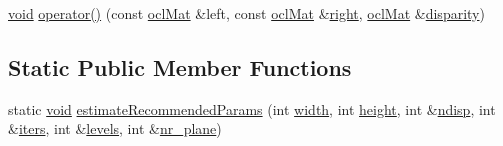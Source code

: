 \begin{DoxyCompactItemize}
\item 
\hyperlink{legacy_8hpp_a8bb47f092d473522721002c86c13b94e}{void} \hyperlink{classcv_1_1ocl_1_1StereoConstantSpaceBP_a829a71b781d10d31c9db75b9f5bcb4f7}{operator()} (const \hyperlink{classcv_1_1ocl_1_1oclMat}{ocl\-Mat} \&left, const \hyperlink{classcv_1_1ocl_1_1oclMat}{ocl\-Mat} \&\hyperlink{legacy_8hpp_a6b04b878081bf724144b73c75dfd1894}{right}, \hyperlink{classcv_1_1ocl_1_1oclMat}{ocl\-Mat} \&\hyperlink{calib3d_8hpp_acd2ef073a3a4984e0a0ebac5c7e179fd}{disparity})
\end{DoxyCompactItemize}
\subsection*{Static Public Member Functions}
\begin{DoxyCompactItemize}
\item 
static \hyperlink{legacy_8hpp_a8bb47f092d473522721002c86c13b94e}{void} \hyperlink{classcv_1_1ocl_1_1StereoConstantSpaceBP_a0494e86163e07c27d23756ec823e9803}{estimate\-Recommended\-Params} (int \hyperlink{highgui__c_8h_a2474a5474cbff19523a51eb1de01cda4}{width}, int \hyperlink{highgui__c_8h_adc7b4b8a6ef510e136071efbc9cd9a58}{height}, int \&\hyperlink{classcv_1_1ocl_1_1StereoConstantSpaceBP_aa03a1a80256f5a32e8ee084ab7c09e70}{ndisp}, int \&\hyperlink{classcv_1_1ocl_1_1StereoConstantSpaceBP_ae5d0bd571e6c37c2474f74d1c7578a26}{iters}, int \&\hyperlink{classcv_1_1ocl_1_1StereoConstantSpaceBP_a73b35f984b49c6363264c3bb6b76f6ec}{levels}, int \&\hyperlink{classcv_1_1ocl_1_1StereoConstantSpaceBP_af2c44af99c4a26c501a719567debef2f}{nr\-\_\-plane})
\end{DoxyCompactItemize}
